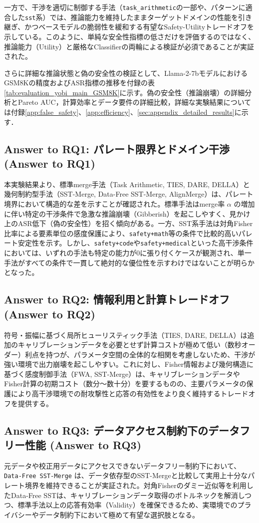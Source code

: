 \documentclass{article}
\begin{document}
一方で、干渉を適切に制御する手法（\texttt{task\_arithmetic}の一部や、パターンに適合した\texttt{sst}系）では、推論能力を維持したままターゲットドメインの性能を引き継ぎ、かつベースモデルの脆弱性を緩和する有望なSafety-Utilityトレードオフを示している。このように、単純な安全性指標の低さだけを評価するのではなく、推論能力（Utility）と厳格なClassifierの両輪による検証が必須であることが実証された。

さらに詳細な推論状態と偽の安全性の検証として、Llama-2-7bモデルにおけるGSM8Kの精度およびASR指標の推移を付録の表\ref{tab:evaluation_yobi_main_GSM8K}に示す。偽の安全性（推論崩壊）の詳細分析とPareto AUC，計算効率とデータ要件の詳細比較，詳細な実験結果については付録\ref{app:false_safety}、\ref{app:efficiency}、\ref{sec:appendix_detailed_results}に示す．

\subsection{Answer to RQ1: パレート限界とドメイン干渉 (Answer to RQ1)}
本実験結果より、標準merge手法（Task Arithmetic, TIES, DARE, DELLA）と幾何制約型手法（SST-Merge, Data-Free SST-Merge, AlignMerge）は、パレート境界において構造的な差を示すことが確認された。標準手法はmerge率 $\alpha$ の増加に伴い特定の干渉条件で急激な推論崩壊（Gibberish）を起こしやすく、見かけ上のASR低下（偽の安全性）を招く傾向がある。一方、SST系手法は対角Fisher比率による要素単位の感度保護により、\texttt{safety+math}等の条件で比較的高いパレート安定性を示す。しかし、\texttt{safety+code}や\texttt{safety+medical}といった高干渉条件においては、いずれの手法も特定の能力が0に張り付くケースが観測され、単一手法がすべての条件で一貫して絶対的な優位性を示すわけではないことが明らかとなった。

\subsection{Answer to RQ2: 情報利用と計算トレードオフ (Answer to RQ2)}
符号・振幅に基づく局所ヒューリスティック手法（TIES, DARE, DELLA）は追加のキャリブレーションデータを必要とせず計算コストが極めて低い（数秒オーダー）利点を持つが、パラメータ空間の全体的な相関を考慮しないため、干渉が強い環境で出力崩壊を起こしやすい。これに対し、Fisher情報および幾何構造に基づく感度制御手法（FWA, SST-Merge）は、キャリブレーションデータやFisher計算の初期コスト（数分〜数十分）を要するものの、主要パラメータの保護により高干渉環境での耐攻撃性と応答の有効性をより良く維持するトレードオフを提供する。

\subsection{Answer to RQ3: データアクセス制約下のデータフリー性能 (Answer to RQ3)}
元データや校正用データにアクセスできないデータフリー制約下において、\texttt{Data-Free SST-Merge} は、データ依存型のSST-Mergeと比較して実用上十分なパレート境界を維持できることが実証された。対角Fisherのダミー近似等を利用したData-Free SSTは、キャリブレーションデータ取得のボトルネックを解消しつつ、標準手法以上の応答有効率（Validity）を確保できるため、実環境でのプライバシーやデータ制約下において極めて有望な選択肢となる。
\end{document}
